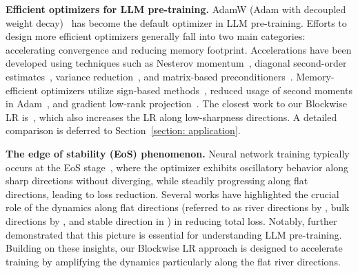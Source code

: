 {\bf Efficient optimizers for LLM pre-training.} AdamW (Adam with decoupled weight decay)~\citep{loshchilov2017decoupled} has become the default optimizer in LLM pre-training. 
Efforts to design more efficient optimizers generally fall into two main categories: accelerating convergence and reducing memory footprint.
Accelerations have been developed using techniques such as Nesterov momentum~\citep{xie2022adan}, diagonal second-order estimates~\citep{liu2023sophia,wang2024improving}, variance reduction~\citep{yuan2024mars}, and matrix-based preconditioners~\citep{jordan2024muon,vyas2024soap}. 
Memory-efficient optimizers utilize sign-based methods~\citep{chen2024symbolic}, reduced usage of second moments in Adam~\citep{zhang2024adam}, and gradient low-rank projection~\citep{zhao2024galore}.
The closest work to our Blockwise LR is~\citet{wang2024improving}, which also increases the LR along low-sharpness directions. A detailed comparison is deferred to Section~\ref{section: application}.


{\bf The edge of stability (EoS) phenomenon.} Neural network training typically occurs at the EoS stage~\citep{wu2018sgd,Jastrzebski2020The,cohen2021gradient,cohen2022adaptive}, where the optimizer exhibits oscillatory behavior along sharp directions without diverging, while steadily progressing along flat directions, leading to loss reduction. Several works \citep{wen2024understanding,song2024does,cohen2024understanding,wang2024improving} have highlighted the crucial role of the dynamics along flat directions (referred to as river directions by \citet{wen2024understanding}, bulk directions by \citet{song2024does}, and stable direction in \citet{wang2024improving}) in reducing total loss. Notably, \citet{wen2024understanding} further demonstrated that this picture is essential for understanding LLM pre-training. Building on these insights, our Blockwise LR approach is designed to accelerate training by amplifying the dynamics particularly along the flat river directions.







